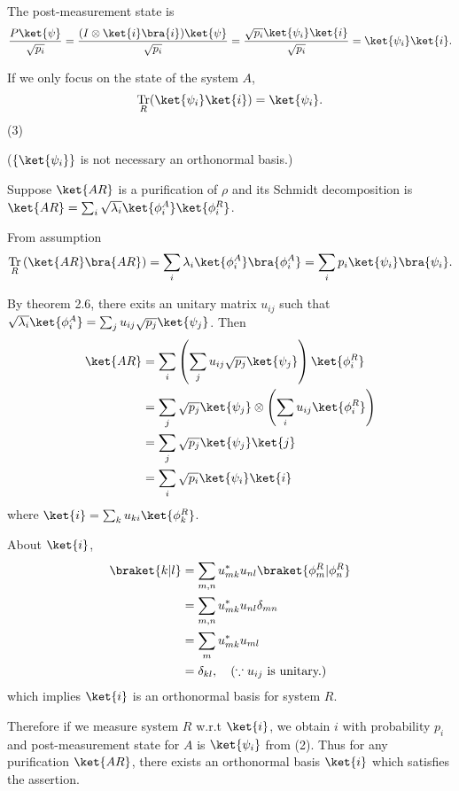 \documentclass[a4paper,12pt]{article}
\DeclareMathOperator{\Tr}{Tr}
\begin{document}
The post-measurement state is
\begin{align*}
    \frac{P \ket{\psi}}{\sqrt{p_i}}
    = \frac{(I \otimes \ket{i}\bra{i}) \ket{\psi}}{\sqrt{p_i}}
        = \frac{\sqrt{p_i} \ket{\psi_i}\ket{i}}{\sqrt{p_i}} = \ket{\psi_i}\ket{i}.
\end{align*}

If we only focus on the state of the system $A$,
\begin{align*}
    \Tr_R (\ket{\psi_i} \ket{i}) = \ket{\psi_i}.
\end{align*}
(3)

($\{ \ket{\psi_i} \}$ is not necessary an orthonormal basis.)


Suppose $\ket{AR}$ is a purification of $\rho$ and its Schmidt decomposition is $\ket{AR} = \sum_i \sqrt{\lambda_i} \ket{\phi_i^A} \ket{\phi_i^R}$.

From assumption
\begin{align*}
    \Tr_R \left( \ket{AR}\bra{AR} \right) = \sum_i \lambda_i \ket{\phi_i^A}\bra{\phi_i^A} = \sum_i p_i \ket{\psi_i}\bra{\psi_i}.
\end{align*}

By theorem 2.6, there exits an unitary matrix $u_{ij}$ such that $\sqrt{\lambda_i}\ket{\phi_i^A} = \sum_j u_{ij} \sqrt{p_j} \ket{\psi_j}$.
Then
\begin{align*}
    \ket{AR} &= \sum_i \left( \sum_j u_{ij} \sqrt{p_j} \ket{\psi_j} \right) \ket{\phi_i^R}\\
             &= \sum_j \sqrt{p_j} \ket{\psi_j} \otimes\left( \sum_i u_{ij} \ket{\phi_i^R} \right)\\
             &= \sum_j \sqrt{p_j} \ket{\psi_j} \ket{j}\\
             &= \sum_i \sqrt{p_i} \ket{\psi_i} \ket{i}
\end{align*}
where $\ket{i} = \sum_k u_{ki} \ket{\phi_k^R}$.

About $\ket{i}$,
\begin{align*}
    \braket{k | l} &= \sum_{m,n} u_{mk}^* u_{nl} \braket{\phi_m^R | \phi_n^R }\\
        &= \sum_{m,n} u_{mk}^* u_{nl} \delta_{mn}\\
        &= \sum_m u_{mk}^* u_{ml}\\
        &= \delta_{kl}, ~~~(\because u_{ij} \text{ is unitary.})
\end{align*}
which implies $\ket{i}$ is an orthonormal basis for system $R$.

Therefore if we measure system $R$ w.r.t $\ket{i}$, we obtain $i$ with probability $p_i$ and post-measurement state for $A$ is $\ket{\psi_i}$ from (2).
Thus for any purification $\ket{AR}$, there exists an orthonormal basis $\ket{i}$ which satisfies the assertion.
\end{document}
